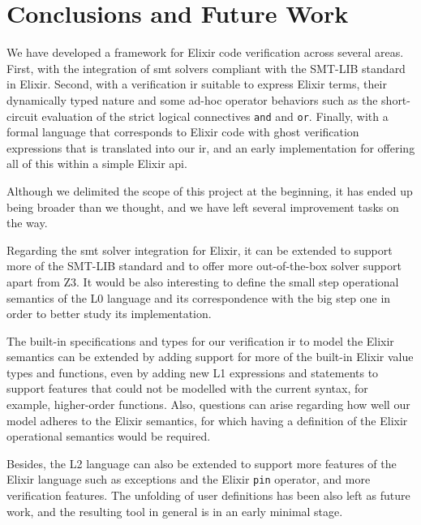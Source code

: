 \chapter{Conclusions and Future Work}
\label{cap:conclusions}


We have developed a framework for Elixir code verification across several areas.
First, with the integration of \acrshort{smt} solvers compliant with the SMT-LIB
standard in Elixir. Second, with a verification \gls{ir} suitable to express
Elixir terms, their dynamically typed nature and some ad-hoc operator behaviors
such as the short-circuit evaluation of the strict logical connectives
\verb|and| and \verb|or|. Finally, with a formal language that corresponds to 
Elixir code with ghost verification expressions that is translated into our
\gls{ir}, and an early implementation for offering all of this within a simple 
Elixir \gls{api}.

Although we delimited the scope of this project at the beginning, it has ended
up being broader than we thought, and we have left several improvement tasks on
the way.

Regarding the \acrshort{smt} solver integration for Elixir, it can be extended
to support more of the SMT-LIB standard and to offer more out-of-the-box solver 
support apart from Z3. It would be also interesting to define the small step 
operational semantics of the L0 language and its correspondence with the big
step one in order to better study its implementation.

The built-in specifications and types for our verification \gls{ir} to model the
Elixir semantics can be extended by adding support for more of the built-in
Elixir value types and functions, even by adding new L1 expressions and
statements to support features that could not be modelled with the current
syntax, for example, higher-order functions. Also, questions can arise regarding
how well our model adheres to the Elixir semantics, for which having a
definition of the Elixir operational semantics would be required.

Besides, the L2 language can also be extended to support more features of the
Elixir language such as exceptions and the Elixir \verb|pin| operator, and more
verification features. The unfolding of user definitions has been also left as
future work, and the resulting tool in general is in an early minimal stage.

